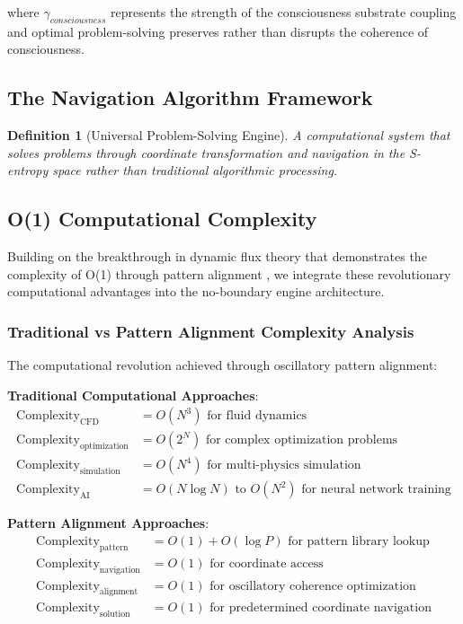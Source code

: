 \documentclass[11pt,a4paper]{article}
\newtheorem{definition}[theorem]{Definition}
\theoremstyle{remark}
\begin{document}
where $\gamma_{consciousness}$ represents the strength of the consciousness substrate coupling and optimal problem-solving preserves rather than disrupts the coherence of consciousness.

\subsection{The Navigation Algorithm Framework}

\begin{definition}[Universal Problem-Solving Engine]
A computational system that solves problems through coordinate transformation and navigation in the S-entropy space rather than traditional algorithmic processing.
\end{definition}

\subsection{O(1) Computational Complexity}

Building on the breakthrough in dynamic flux theory that demonstrates the complexity of O(1) through pattern alignment \cite{sachikonye2024flux}, we integrate these revolutionary computational advantages into the no-boundary engine architecture.

\subsubsection{Traditional vs Pattern Alignment Complexity Analysis}

The computational revolution achieved through oscillatory pattern alignment:

\textbf{Traditional Computational Approaches}:
\begin{align}
\text{Complexity}_{\text{CFD}} &= O(N^3) \text{ for fluid dynamics} \\
\text{Complexity}_{\text{optimization}} &= O(2^N) \text{ for complex optimization problems} \\
\text{Complexity}_{\text{simulation}} &= O(N^4) \text{ for multi-physics simulation} \\
\text{Complexity}_{\text{AI}} &= O(N \log N) \text{ to } O(N^2) \text{ for neural network training}
\end{align}

\textbf{Pattern Alignment Approaches}:
\begin{align}
\text{Complexity}_{\text{pattern}} &= O(1) + O(\log P) \text{ for pattern library lookup} \\
\text{Complexity}_{\text{navigation}} &= O(1) \text{ for coordinate access} \\
\text{Complexity}_{\text{alignment}} &= O(1) \text{ for oscillatory coherence optimization} \\
\text{Complexity}_{\text{solution}} &= O(1) \text{ for predetermined coordinate navigation}
\end{align}
\end{document}
